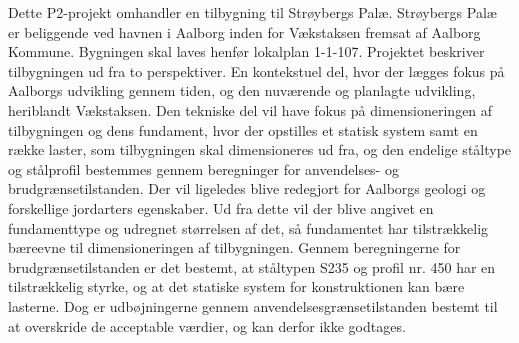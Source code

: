 Dette P2-projekt omhandler en tilbygning til Strøybergs Palæ. Strøybergs Palæ er beliggende ved havnen i Aalborg inden for Vækstaksen fremsat af Aalborg Kommune. Bygningen skal laves henfør lokalplan 1-1-107. Projektet beskriver tilbygningen ud fra to perspektiver. En kontekstuel del, hvor der lægges fokus på Aalborgs udvikling gennem tiden, og den nuværende og planlagte udvikling, heriblandt Vækstaksen. Den tekniske del vil have fokus på dimensioneringen af tilbygningen og dens fundament, hvor der opstilles et statisk system samt en række laster, som tilbygningen skal dimensioneres ud fra, og den endelige ståltype og stålprofil bestemmes gennem beregninger for anvendelses- og brudgrænsetilstanden. Der vil ligeledes blive redegjort for Aalborgs geologi og forskellige jordarters egenskaber. Ud fra dette vil der blive angivet en fundamenttype og udregnet størrelsen af det, så fundamentet har tilstrækkelig bæreevne til dimensioneringen af tilbygningen. Gennem beregningerne for brudgrænsetilstanden er det bestemt, at ståltypen S235 og profil nr. 450 har en tilstrækkelig styrke, og at det statiske system for konstruktionen kan bære lasterne. Dog er udbøjningerne gennem anvendelsesgrænsetilstanden bestemt til at overskride de acceptable værdier, og kan derfor ikke godtages.